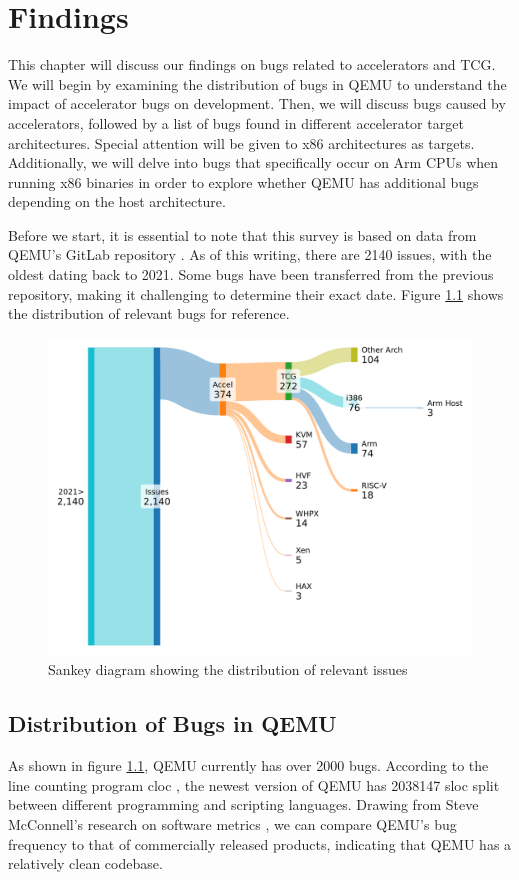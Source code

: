 
\chapter{Findings}\label{chapter:findings}
This chapter will discuss our findings on bugs related to accelerators and \ac{TCG}.
We will begin by examining the distribution of bugs in \ac{QEMU} to understand the impact of accelerator bugs on development.
Then, we will discuss bugs caused by accelerators, followed by a list of bugs found in different accelerator target architectures.
Special attention will be given to x86 architectures as targets.
Additionally, we will delve into bugs that specifically occur on Arm CPUs when running x86 binaries in order to explore whether \ac{QEMU} has additional bugs depending on the host architecture.

Before we start, it is essential to note that this survey is based on data from \ac{QEMU}'s GitLab repository \cite{qemu_issues}.
As of this writing, there are 2140 issues, with the oldest dating back to 2021.
Some bugs have been transferred from the previous repository, making it challenging to determine their exact date.
Figure \ref{fig:issues} shows the distribution of relevant bugs for reference.

\begin{figure}[ht]
    \centering
    \includegraphics[width=0.8\linewidth]{figures/issues3}
    \caption[QEMU bug distribution]{Sankey diagram showing the distribution of relevant issues}
    \label{fig:issues}
\end{figure}

\section{Distribution of Bugs in \ac{QEMU}}
As shown in figure \ref{fig:issues}, \ac{QEMU} currently has over 2000 bugs.
According to the line counting program cloc \cite{cloc}, the newest version of \ac{QEMU} has 2038147 \ac{sloc} split between different programming and scripting languages.
Drawing from Steve McConnell's research on software metrics \cite{sloc}, we can compare \ac{QEMU}'s bug frequency to that of commercially released products, indicating that \ac{QEMU} has a relatively clean codebase.


